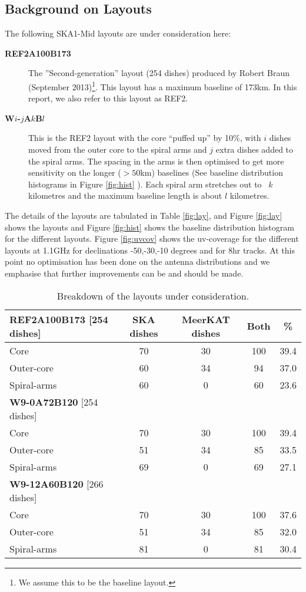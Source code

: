 \documentclass[sfheadings,a4paper,times,9pt,floats,floatfix]{article}
\begin{document}
\subsection{Background on Layouts}\label{sec:layouts}
The following SKA1-Mid layouts are under consideration here:
\begin{description}
\item[{\bf REF2A100B173}] The ”Second-generation” layout (254 dishes) produced by Robert Braun (September 2013)\footnote{We assume
this to be the baseline layout.}. This layout has a maximum baseline of 173km. In this report, we also refer to this layout as
REF2.
\item[{\bf W$i$-$j$A$k$B$l$}] This is the REF2 layout with the core ``puffed up'' by 10\%,  with $ i$ dishes moved  from the
outer core to the spiral arms and $j$ extra dishes added to the spiral arms. The spacing in the arms is then optimised  to get
more sensitivity on the longer ($>50$km) baselines (See baseline distribution histograms in Figure \ref{fig:hist} ). Each spiral
arm stretches out to ~$k$ kilometres and the maximum baseline length is about $l$ kilometres.
\end{description}
The details of the layouts are tabulated in Table \ref{fig:lay}, and Figure \ref{fig:lay} shows the layouts and Figure
\ref{fig:hist} shows the baseline distribution histogram for the different layouts. Figure \ref{fig:uvcov} shows the uv-coverage
for the different layouts at 1.1GHz for declinations -50,-30,-10
degrees and for 8hr tracks. At this point no optimisation has been
done on the antenna distributions and we emphasise that further improvements can be and should be made.
\begin{table}[H]
\centering
 \tiny{
 \begin{tabular}{l|cccc}\hline
 {\bf REF2A100B173} [254 dishes] & SKA dishes&  MeerKAT dishes & Both & \% \\\hline\hline
  Core & 70 & 30 & 100 & 39.4 \\
 Outer-core & 60 & 34 & 94 & 37.0 \\
 Spiral-arms & 60 & 0 & 60 & 23.6 \\\hline\hline
  {\bf W9-0A72B120} [254 dishes] &  & &  & \\\hline\hline
  Core & 70 & 30 & 100 & 39.4 \\
 Outer-core & 51 & 34 & 85 & 33.5 \\
 Spiral-arms & 69 & 0 & 69 & 27.1 \\\hline\hline
  {\bf W9-12A60B120} [266 dishes] &  & &  & \\\hline\hline
  Core & 70 & 30 & 100 & 37.6 \\
 Outer-core & 51 & 34 & 85 & 32.0 \\
 Spiral-arms & 81 & 0 & 81 & 30.4 \\\hline\hline
 \end{tabular}}
 \caption{Breakdown of the layouts under consideration.}\label{tab:lay}
\end{table}
\end{document}
